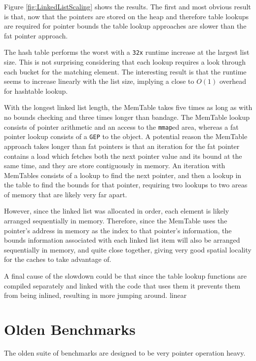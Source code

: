 

Figure \ref{fig:LinkedListScaling} shows the results.
The first and most obvious result is that, now that the pointers are stored on the heap and therefore table lookups are required for pointer bounds the table lookup approaches are slower than the fat pointer approach.

The hash table performs the worst with a \verb!32x! runtime increase at the largest list size.
This is not surprising considering that each lookup requires a look through each bucket for the matching element.
The interesting result is that the runtime seems to increase linearly with the list size, implying a close to $O(1)$ overhead for hashtable lookup.

With the longest linked list length, the MemTable takes five times as long as with no bounds checking and three times longer than bandage.
The MemTable lookup consists of pointer arithmetic and an access to the \verb!mmap!ed area, whereas a fat pointer lookup consists of a \verb!GEP! to the object.
A potential reason the MemTable approach takes longer than fat pointers is that an iteration for the fat pointer contains a load which fetches both the next pointer value and its bound at the same time, and they are store contiguously in memory.
An iteration with MemTables consists of a lookup to find the next pointer, and then a lookup in the table to find the bounds for that pointer, requiring two lookups to two areas of memory that are likely very far apart.

However, since the linked list was allocated in order, each element is likely arranged sequentially in memory.
Therefore, since the MemTable uses the pointer's address in memory as the index to that pointer's information, the bounds information associated with each linked list item will also be arranged sequentially in memory, and quite close together, giving very good spatial locality for the caches to take advantage of.

A final cause of the slowdown could be that since the table lookup functions are compiled separately and linked with the code that uses them it prevents them from being inlined, resulting in more jumping around.
 linear

\section{Olden Benchmarks}

The olden suite of benchmarks are designed to be very pointer operation heavy.


